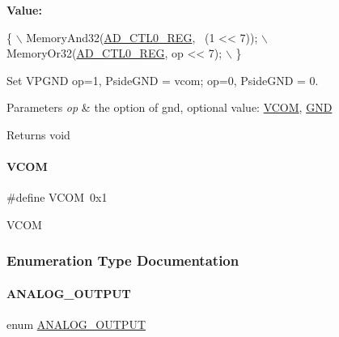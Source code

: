 {\bfseries Value\+:}
\begin{DoxyCode}
\{                                        \(\backslash\)
        MemoryAnd32(\mbox{\hyperlink{a00020_adadaa0ab1ebbd7ba9b70dfd24c3ed44da479497b755dee411ad6348cae2ef26b4}{AD\_CTL0\_REG}}, ~(1 << 7)); \(\backslash\)
        MemoryOr32(\mbox{\hyperlink{a00020_adadaa0ab1ebbd7ba9b70dfd24c3ed44da479497b755dee411ad6348cae2ef26b4}{AD\_CTL0\_REG}}, op << 7);    \(\backslash\)
    \}
\end{DoxyCode}


Set V\+P\+G\+ND op=1, Pside\+G\+ND = vcom; op=0, Pside\+G\+ND = 0. 


\begin{DoxyParams}{Parameters}
{\em op} & the option of gnd, optional value\+: \mbox{\hyperlink{a00002_af5ad26ac9fe7dfd16ab8c8219b24ec93}{V\+C\+OM}}, \mbox{\hyperlink{a00002_a2c058e9d24bb65c1a6ad2d439b2976ab}{G\+ND}} \\
\hline
\end{DoxyParams}
\begin{DoxyReturn}{Returns}
void 
\end{DoxyReturn}
\mbox{\label{a00002_af5ad26ac9fe7dfd16ab8c8219b24ec93}} 
\paragraph{\texorpdfstring{V\+C\+OM}{VCOM}}
{\footnotesize\ttfamily \#define V\+C\+OM~0x1}

V\+C\+OM 

\subsubsection{Enumeration Type Documentation}
\mbox{\label{a00002_a4d490931c48f5330b52533397251335c}} 
\paragraph{\texorpdfstring{A\+N\+A\+L\+O\+G\+\_\+\+O\+U\+T\+P\+UT}{ANALOG\_OUTPUT}}
{\footnotesize\ttfamily enum \mbox{\hyperlink{a00002_a4d490931c48f5330b52533397251335c}{A\+N\+A\+L\+O\+G\+\_\+\+O\+U\+T\+P\+UT}}}

